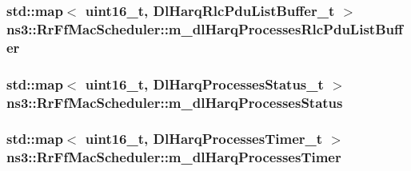 \subsubsection[{\texorpdfstring{m\+\_\+dl\+Harq\+Processes\+Rlc\+Pdu\+List\+Buffer}{m_dlHarqProcessesRlcPduListBuffer}}]{\setlength{\rightskip}{0pt plus 5cm}std\+::map$<$ uint16\+\_\+t, {\bf Dl\+Harq\+Rlc\+Pdu\+List\+Buffer\+\_\+t} $>$ ns3\+::\+Rr\+Ff\+Mac\+Scheduler\+::m\+\_\+dl\+Harq\+Processes\+Rlc\+Pdu\+List\+Buffer\hspace{0.3cm}{\ttfamily [private]}}\hypertarget{classns3_1_1RrFfMacScheduler_a2a6afd0a7df7a71c20382176f6cc9573}{}\label{classns3_1_1RrFfMacScheduler_a2a6afd0a7df7a71c20382176f6cc9573}
\subsubsection[{\texorpdfstring{m\+\_\+dl\+Harq\+Processes\+Status}{m_dlHarqProcessesStatus}}]{\setlength{\rightskip}{0pt plus 5cm}std\+::map$<$ uint16\+\_\+t, {\bf Dl\+Harq\+Processes\+Status\+\_\+t} $>$ ns3\+::\+Rr\+Ff\+Mac\+Scheduler\+::m\+\_\+dl\+Harq\+Processes\+Status\hspace{0.3cm}{\ttfamily [private]}}\hypertarget{classns3_1_1RrFfMacScheduler_aa3d12b5abcb9afeea093150a6572aaed}{}\label{classns3_1_1RrFfMacScheduler_aa3d12b5abcb9afeea093150a6572aaed}
\subsubsection[{\texorpdfstring{m\+\_\+dl\+Harq\+Processes\+Timer}{m_dlHarqProcessesTimer}}]{\setlength{\rightskip}{0pt plus 5cm}std\+::map$<$ uint16\+\_\+t, {\bf Dl\+Harq\+Processes\+Timer\+\_\+t} $>$ ns3\+::\+Rr\+Ff\+Mac\+Scheduler\+::m\+\_\+dl\+Harq\+Processes\+Timer\hspace{0.3cm}{\ttfamily [private]}}\hypertarget{classns3_1_1RrFfMacScheduler_ab5040cff67dad6c8fdfc9c32c90916df}{}\label{classns3_1_1RrFfMacScheduler_ab5040cff67dad6c8fdfc9c32c90916df}
